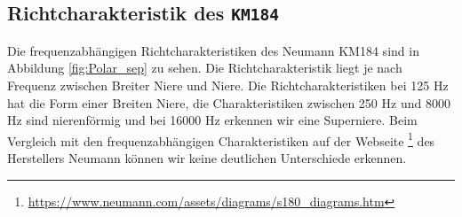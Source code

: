 \subsection{Richtcharakteristik des \texttt{KM184}}
\label{subsec:d}
Die frequenzabhängigen Richtcharakteristiken des Neumann KM184 sind in Abbildung \ref{fig:Polar_sep} zu sehen.
Die Richtcharakteristik liegt je nach Frequenz zwischen Breiter Niere und Niere. 
Die Richtcharakteristiken bei 125 Hz hat die Form einer Breiten Niere, die Charakteristiken zwischen 250 Hz und 8000 Hz sind nierenförmig und bei 16000 Hz erkennen wir eine Superniere.
Beim Vergleich mit den frequenzabhängigen Charakteristiken auf der Webseite \footnote{\url{https://www.neumann.com/assets/diagrams/s180_diagrams.htm}} des Herstellers Neumann können wir keine deutlichen Unterschiede erkennen.

